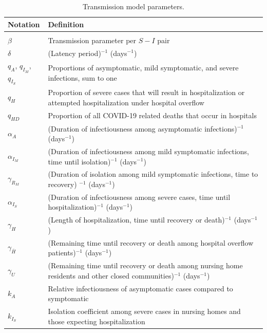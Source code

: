 \documentclass[11pt]{article}
\begin{document}



\begingroup
\renewcommand\arraystretch{0.5}
\begin{table}[!htb] 
	\caption{Transmission model parameters.} 
	\vspace{.5em}
	\begin{tabular}{p{} p{} }
	\toprule
	Notation & Definition \\[0.5em] \hline \\
	$\beta$ & Transmission parameter per $S-I$ pair \\[0.5em]
	$\delta$ & (Latency period)$^{-1}$ (days$^{-1}$) \\[0.5em]
	$q_A$, $q_{I_M}$, $q_{I_S}$  & Proportions of asymptomatic, mild symptomatic, and severe infections, sum to one \\[0.5em]
	$q_H$ & Proportion of severe cases that will result in hospitalization or attempted hospitalization under hospital overflow \\ [0.5em]
	$q_{HD}$ & Proportion of all COVID-19 related deaths that occur in hospitals \\ [0.5em]
	$\alpha_A$ & (Duration of infectiousness among asymptomatic infections)$^{-1}$ (days$^{-1}$) \\[0.5em]	
	$\alpha_{I_M}$ & (Duration of infectiousness among mild symptomatic infections, time until isolation)$^{-1}$ (days$^{-1}$) \\[0.5em]
	$\gamma_{R_M}$ & (Duration of isolation among mild symptomatic infections, time to recovery)	$^{-1}$ (days$^{-1}$) \\[0.5em]
	$\alpha_{I_S}$ & (Duration of infectiousness among severe cases, time until hospitalization)$^{-1}$ (days$^{-1}$) \\[0.5em]	
	$\gamma_{H}$ & (Length of hospitalization, time until recovery or death)$^{-1}$ (days$^{-1}$) \\[0.5em]
	$\gamma_{\bar{H}}$ & (Remaining time until recovery or death among hospital overflow patients)$^{-1}$ (days$^{-1}$) \\[0.5em]
	$\gamma_{U}$ & (Remaining time until recovery or death among nursing home residents and other closed communities)$^{-1}$ (days$^{-1}$) \\[0.5em]
	$k_A$ & Relative infectiousness of asymptomatic cases compared to symptomatic \\[0.5em]
	$k_{I_S}$ & Isolation coefficient among severe cases in nursing homes and those expecting hospitalization \\[0.5em]

\end{tabular}
\end{table}
\end{document}
